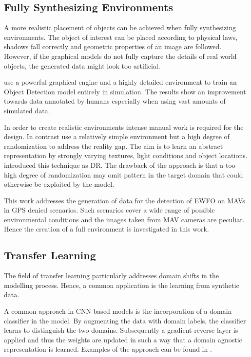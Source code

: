 \subsection{Fully Synthesizing Environments}

A more realistic placement of objects can be achieved when fully synthesizing environments.  The object of interest can be placed according to physical laws, shadows fall correctly and geometric properties of an image are followed. However, if the graphical models do not fully capture the details of real world objects, the generated data might look too artificial.

\citeauthor{Johnson-Roberson2016} \cite{Johnson-Roberson2016} use a powerful graphical engine and a highly detailed environment to train an Object Detection model entirely in simulation. The results show an improvement towards data annotated by humans especially when using vast amounts of simulated data.  

In order to create realistic environments intense manual work is required for the design. In contrast \cite{Sadeghi2016, Tobin2017, Tremblay2018a} use a relatively simple environment but a high degree of randomization to address the reality gap. The aim is to learn an abstract representation by strongly varying textures, light conditions and object locations. \citeauthor{Tobin2017} introduced this technique as \ac{DR}. The drawback of the approach is that a too high degree of randomization may omit pattern in the target domain that could otherwise be exploited by the model. 

This work addresses the generation of data for the detection of \ac{EWFO} on \acp{MAV} in \ac{GPS} denied scenarios. Such scenarios cover a wide range of possible environmental conditions and the images taken from \ac{MAV} cameras are peculiar. Hence the creation of a full environment is investigated in this work. 


\subsection{Transfer Learning}

The field of transfer learning particularly addresses domain shifts in the modelling process. Hence, a common application is the learning from synthetic data.

A common approach in \ac{CNN}-based models is the incorporation of a domain classifier in the model. By augmenting the data with domain labels, the classifier learns to distinguish the two domains. Subsequently a gradient reverse layer is applied and thus the weights are updated in such a way that a domain agnostic representation is learned. Examples of the approach can be found in \cite{Chen2018c} \cite{Xu2017}.

